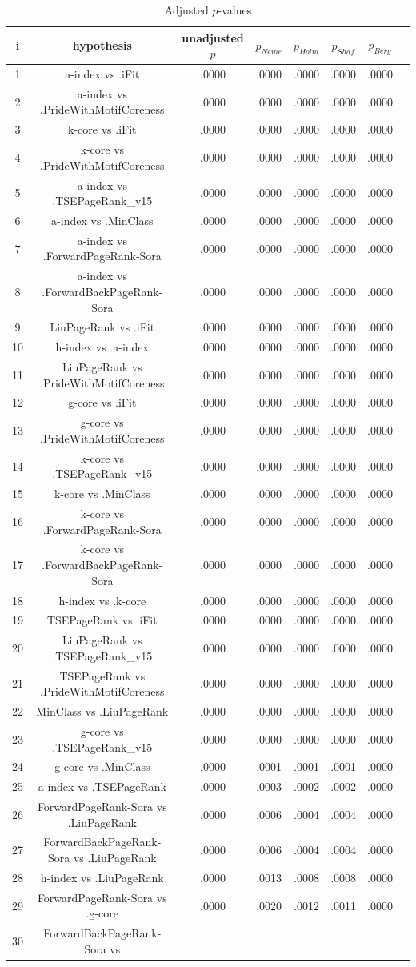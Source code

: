 \documentclass[a4paper,10pt]{article}
\begin{document}
\begin{landscape}
\begin{table}[!htp]
\centering\tiny
\caption{Adjusted $p$-values}
\begin{tabular}{cccccccc}
i&hypothesis&unadjusted $p$&$p_{Neme}$&$p_{Holm}$&$p_{Shaf}$&$p_{Berg}$\\
\hline
1&a-index vs .iFit&.0000&.0000&.0000&.0000&.0000\\2&a-index vs .PrideWithMotifCoreness&.0000&.0000&.0000&.0000&.0000\\3&k-core vs .iFit&.0000&.0000&.0000&.0000&.0000\\4&k-core vs .PrideWithMotifCoreness&.0000&.0000&.0000&.0000&.0000\\5&a-index vs .TSEPageRank_v15&.0000&.0000&.0000&.0000&.0000\\6&a-index vs .MinClass&.0000&.0000&.0000&.0000&.0000\\7&a-index vs .ForwardPageRank-Sora&.0000&.0000&.0000&.0000&.0000\\8&a-index vs .ForwardBackPageRank-Sora&.0000&.0000&.0000&.0000&.0000\\9&LiuPageRank vs .iFit&.0000&.0000&.0000&.0000&.0000\\10&h-index vs .a-index&.0000&.0000&.0000&.0000&.0000\\11&LiuPageRank vs .PrideWithMotifCoreness&.0000&.0000&.0000&.0000&.0000\\12&g-core vs .iFit&.0000&.0000&.0000&.0000&.0000\\13&g-core vs .PrideWithMotifCoreness&.0000&.0000&.0000&.0000&.0000\\14&k-core vs .TSEPageRank_v15&.0000&.0000&.0000&.0000&.0000\\15&k-core vs .MinClass&.0000&.0000&.0000&.0000&.0000\\16&k-core vs .ForwardPageRank-Sora&.0000&.0000&.0000&.0000&.0000\\17&k-core vs .ForwardBackPageRank-Sora&.0000&.0000&.0000&.0000&.0000\\18&h-index vs .k-core&.0000&.0000&.0000&.0000&.0000\\19&TSEPageRank vs .iFit&.0000&.0000&.0000&.0000&.0000\\20&LiuPageRank vs .TSEPageRank_v15&.0000&.0000&.0000&.0000&.0000\\21&TSEPageRank vs .PrideWithMotifCoreness&.0000&.0000&.0000&.0000&.0000\\22&MinClass vs .LiuPageRank&.0000&.0000&.0000&.0000&.0000\\23&g-core vs .TSEPageRank_v15&.0000&.0000&.0000&.0000&.0000\\24&g-core vs .MinClass&.0000&.0001&.0001&.0001&.0000\\25&a-index vs .TSEPageRank&.0000&.0003&.0002&.0002&.0000\\26&ForwardPageRank-Sora vs .LiuPageRank&.0000&.0006&.0004&.0004&.0000\\27&ForwardBackPageRank-Sora vs .LiuPageRank&.0000&.0006&.0004&.0004&.0000\\28&h-index vs .LiuPageRank&.0000&.0013&.0008&.0008&.0000\\29&ForwardPageRank-Sora vs .g-core&.0000&.0020&.0012&.0011&.0000\\30&ForwardBackPageRank-Sora vs 
\end{tabular}
\end{table}
\end{landscape}
\end{document}
